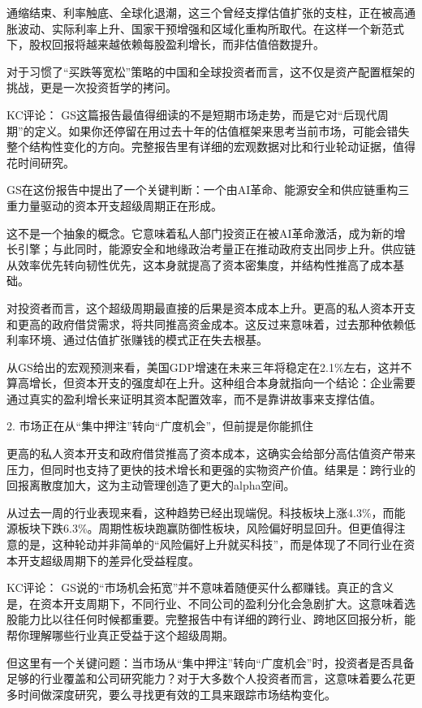 \documentclass[11pt]{ctexart}
\begin{document}
通缩结束、利率触底、全球化退潮，这三个曾经支撑估值扩张的支柱，正在被高通胀波动、实际利率上升、国家干预增强和区域化重构所取代。在这样一个新范式下，股权回报将越来越依赖每股盈利增长，而非估值倍数提升。

对于习惯了“买跌等宽松”策略的中国和全球投资者而言，这不仅是资产配置框架的挑战，更是一次投资哲学的拷问。

KC评论： GS这篇报告最值得细读的不是短期市场走势，而是它对“后现代周期”的定义。如果你还停留在用过去十年的估值框架来思考当前市场，可能会错失整个结构性变化的方向。完整报告里有详细的宏观数据对比和行业轮动证据，值得花时间研究。

GS在这份报告中提出了一个关键判断：一个由AI革命、能源安全和供应链重构三重力量驱动的资本开支超级周期正在形成。

这不是一个抽象的概念。它意味着私人部门投资正在被AI革命激活，成为新的增长引擎；与此同时，能源安全和地缘政治考量正在推动政府支出同步上升。供应链从效率优先转向韧性优先，这本身就提高了资本密集度，并结构性推高了成本基础。

对投资者而言，这个超级周期最直接的后果是资本成本上升。更高的私人资本开支和更高的政府借贷需求，将共同推高资金成本。这反过来意味着，过去那种依赖低利率环境、通过估值扩张赚钱的模式正在失去根基。

从GS给出的宏观预测来看，美国GDP增速在未来三年将稳定在2.1\%左右，这并不算高增长，但资本开支的强度却在上升。这种组合本身就指向一个结论：企业需要通过真实的盈利增长来证明其资本配置效率，而不是靠讲故事来支撑估值。

2. 市场正在从“集中押注”转向“广度机会”，但前提是你能抓住

更高的私人资本开支和政府借贷推高了资本成本，这确实会给部分高估值资产带来压力，但同时也支持了更快的技术增长和更强的实物资产价值。结果是：跨行业的回报离散度加大，这为主动管理创造了更大的alpha空间。

从过去一周的行业表现来看，这种趋势已经出现端倪。科技板块上涨4.3\%，而能源板块下跌6.3\%。周期性板块跑赢防御性板块，风险偏好明显回升。但更值得注意的是，这种轮动并非简单的“风险偏好上升就买科技”，而是体现了不同行业在资本开支超级周期下的差异化受益程度。

KC评论： GS说的“市场机会拓宽”并不意味着随便买什么都赚钱。真正的含义是，在资本开支周期下，不同行业、不同公司的盈利分化会急剧扩大。这意味着选股能力比以往任何时候都重要。完整报告中有详细的跨行业、跨地区回报分析，能帮你理解哪些行业真正受益于这个超级周期。

但这里有一个关键问题：当市场从“集中押注”转向“广度机会”时，投资者是否具备足够的行业覆盖和公司研究能力？对于大多数个人投资者而言，这意味着要么花更多时间做深度研究，要么寻找更有效的工具来跟踪市场结构变化。
\end{document}
